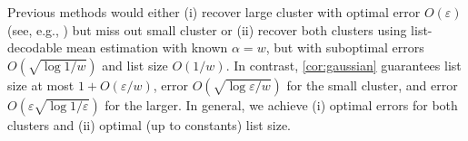 Previous methods would either (i) recover large cluster with optimal error \(O(\varepsilon)\) (see, e.g., \cite{optimalErrorHuberModel}) but miss out small cluster  
or (ii) recover both clusters using list-decodable mean estimation with known $\alpha = w$, but with suboptimal errors \(O(\sqrt{\log 1 / w})\) and list size \(O(1 / w)\).
In contrast, \cref{cor:gaussian} guarantees list size at most \(1 + O(\varepsilon / w)\), error \(O(\sqrt{\log \varepsilon / w})\) for the small cluster, and error \(O(\varepsilon \sqrt{\log 1 / \varepsilon})\) for the larger. 
In general, we achieve (i) optimal errors for both clusters and (ii) optimal (up to constants) list size.